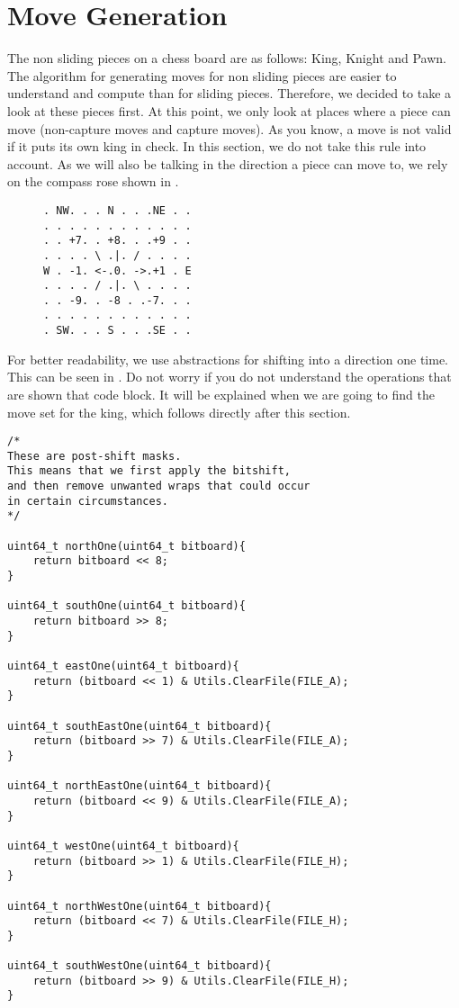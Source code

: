 \section{Move Generation}
The non sliding pieces on a chess board are as follows: King, Knight and Pawn. 
The algorithm for generating moves for non sliding pieces are easier to understand and compute than for sliding pieces.
Therefore, we decided to take a look at these pieces first.
At this point, we only look at places where a piece can move (non-capture moves and capture moves).
As you know, a move is not valid if it puts its own king in check.
In this section, we do not take this rule into account.
As we will also be talking in the direction a piece can move to, we rely on the compass rose shown in .
%
\begin{figure}
\begin{adjustwidth}{.37\textwidth}{}
\begin{verbatim}
. NW. . . N . . .NE . .
. . . . . . . . . . . .
. . +7. . +8. . .+9 . . 
. . . . \ .|. / . . . .
W . -1. <-.0. ->.+1 . E
. . . . / .|. \ . . . .
. . -9. . -8 . .-7. . .
. . . . . . . . . . . .
. SW. . . S . . .SE . .
\end{verbatim}
\end{adjustwidth}
\label{fig: compass rose}
\end{figure}
%
For better readability, we use abstractions for shifting into a direction one time.
This can be seen in .
Do not worry if you do not understand the operations that are shown that code block.
It will be explained when we are going to find the move set for the king, which follows directly after this section.
%
\begin{listing}[H]
\begin{verbatim}
/*
These are post-shift masks. 
This means that we first apply the bitshift,
and then remove unwanted wraps that could occur
in certain circumstances.
*/

uint64_t northOne(uint64_t bitboard){
	return bitboard << 8;
}

uint64_t southOne(uint64_t bitboard){
	return bitboard >> 8;
}

uint64_t eastOne(uint64_t bitboard){
	return (bitboard << 1) & Utils.ClearFile(FILE_A);
}

uint64_t southEastOne(uint64_t bitboard){
	return (bitboard >> 7) & Utils.ClearFile(FILE_A);
}

uint64_t northEastOne(uint64_t bitboard){
	return (bitboard << 9) & Utils.ClearFile(FILE_A);
}

uint64_t westOne(uint64_t bitboard){
	return (bitboard >> 1) & Utils.ClearFile(FILE_H);
}

uint64_t northWestOne(uint64_t bitboard){
	return (bitboard << 7) & Utils.ClearFile(FILE_H);
}

uint64_t southWestOne(uint64_t bitboard){
	return (bitboard >> 9) & Utils.ClearFile(FILE_H);
}
\end{verbatim}
\label{fig: shifting abstractions}
\end{listing}
%
